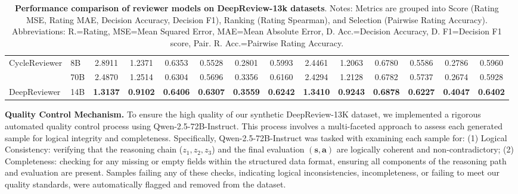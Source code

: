 \documentclass{article}
\begin{document}
\begin{table}[h]
{\begin{tabular}{@{}ll|cccc|c|c|cccc|c|c@{}}
\midrule

\multirow{2}{*}{CycleReviewer}
 & 8B  & 2.8911 & 1.2371 & 0.6353 & 0.5528 & 0.2801 & 0.5993 & 2.4461 & 1.2063 & 0.6780 & 0.5586 & 0.2786 & 0.5960 \\
 & 70B & 2.4870 & 1.2514 & 0.6304 & 0.5696 & 0.3356 & 0.6160 & 2.4294 & 1.2128 & 0.6782 & 0.5737 & 0.2674 & 0.5928 \\

\midrule
 DeepReviewer & 14B  & \cellcolor[HTML]{F9EBE3}\textbf{1.3137} & \cellcolor[HTML]{F9EBE3}\textbf{0.9102} & \cellcolor[HTML]{F9EBE3}\textbf{0.6406} & \cellcolor[HTML]{F9EBE3}\textbf{0.6307} & \cellcolor[HTML]{F9EBE3}\textbf{0.3559} & \cellcolor[HTML]{F9EBE3}\textbf{0.6242} & \cellcolor[HTML]{F9EBE3}\textbf{1.3410} & \cellcolor[HTML]{F9EBE3}\textbf{0.9243} & \cellcolor[HTML]{F9EBE3}\textbf{0.6878} & \cellcolor[HTML]{F9EBE3}\textbf{0.6227} & \cellcolor[HTML]{F9EBE3}\textbf{0.4047} & \cellcolor[HTML]{F9EBE3}\textbf{0.6402}\\

\bottomrule
\end{tabular}}
\caption{\textbf{Performance comparison of reviewer models on DeepReview-13k datasets}. Notes: Metrics are grouped into Score (Rating MSE, Rating MAE, Decision Accuracy, Decision F1), Ranking (Rating Spearman), and Selection (Pairwise Rating Accuracy). Abbreviations: R.=Rating, MSE=Mean Squared Error, MAE=Mean Absolute Error, D. Acc.=Decision Accuracy, D. F1=Decision F1 score, Pair. R. Acc.=Pairwise Rating Accuracy.}
\label{tab:mresults}
\end{table}


\textbf{Quality Control Mechanism.} To ensure the high quality of our synthetic DeepReview-13K dataset, we implemented a rigorous automated quality control process using Qwen-2.5-72B-Instruct. This process involves a multi-faceted approach to assess each generated sample for logical integrity and completeness. Specifically, Qwen-2.5-72B-Instruct was tasked with examining each sample for: (1) Logical Consistency: verifying that the reasoning chain ($z_1, z_2, z_3$) and the final evaluation $(\mathbf{s}, \mathbf{a})$ are logically coherent and non-contradictory; (2) Completeness: checking for any missing or empty fields within the structured data format, ensuring all components of the reasoning path and evaluation are present. Samples failing any of these checks, indicating logical inconsistencies, incompleteness, or failing to meet our quality standards, were automatically flagged and removed from the dataset.
\end{document}
